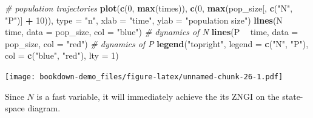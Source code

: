 \documentclass[
]{book}
\newenvironment{Shaded}{\begin{snugshade}}{\end{snugshade}}
\newcommand{\CommentTok}[1]{\textcolor[rgb]{0.56,0.35,0.01}{\textit{#1}}}
\newcommand{\DataTypeTok}[1]{\textcolor[rgb]{0.13,0.29,0.53}{#1}}
\newcommand{\DecValTok}[1]{\textcolor[rgb]{0.00,0.00,0.81}{#1}}
\newcommand{\KeywordTok}[1]{\textcolor[rgb]{0.13,0.29,0.53}{\textbf{#1}}}
\newcommand{\NormalTok}[1]{#1}
\newcommand{\OperatorTok}[1]{\textcolor[rgb]{0.81,0.36,0.00}{\textbf{#1}}}
\newcommand{\StringTok}[1]{\textcolor[rgb]{0.31,0.60,0.02}{#1}}
\begin{document}
\begin{Shaded}
\begin{Highlighting}[]
\CommentTok{# population trajectories}
\KeywordTok{plot}\NormalTok{(}\KeywordTok{c}\NormalTok{(}\DecValTok{0}\NormalTok{, }\KeywordTok{max}\NormalTok{(times)), }\KeywordTok{c}\NormalTok{(}\DecValTok{0}\NormalTok{, }\KeywordTok{max}\NormalTok{(pop_size[, }\KeywordTok{c}\NormalTok{(}\StringTok{"N"}\NormalTok{, }\StringTok{"P"}\NormalTok{)] }\OperatorTok{+}\StringTok{ }\DecValTok{10}\NormalTok{)), }\DataTypeTok{type =} \StringTok{"n"}\NormalTok{, }\DataTypeTok{xlab =} \StringTok{"time"}\NormalTok{, }\DataTypeTok{ylab =} \StringTok{"population size"}\NormalTok{)}
\KeywordTok{lines}\NormalTok{(N }\OperatorTok{~}\StringTok{ }\NormalTok{time, }\DataTypeTok{data =}\NormalTok{ pop_size, }\DataTypeTok{col =} \StringTok{"blue"}\NormalTok{) }\CommentTok{# dynamics of N}
\KeywordTok{lines}\NormalTok{(P }\OperatorTok{~}\StringTok{ }\NormalTok{time, }\DataTypeTok{data =}\NormalTok{ pop_size, }\DataTypeTok{col =} \StringTok{"red"}\NormalTok{) }\CommentTok{# dynamics of P}
\KeywordTok{legend}\NormalTok{(}\StringTok{"topright"}\NormalTok{, }\DataTypeTok{legend =} \KeywordTok{c}\NormalTok{(}\StringTok{"N"}\NormalTok{, }\StringTok{"P"}\NormalTok{), }\DataTypeTok{col =} \KeywordTok{c}\NormalTok{(}\StringTok{"blue"}\NormalTok{, }\StringTok{"red"}\NormalTok{), }\DataTypeTok{lty =} \DecValTok{1}\NormalTok{)}
\end{Highlighting}
\end{Shaded}

\texttt{[image: bookdown-demo\_files/figure-latex/unnamed-chunk-26-1.pdf]}

Since \(N\) is a fast variable, it will immediately achieve the its ZNGI on the state-space diagram.
\end{document}
